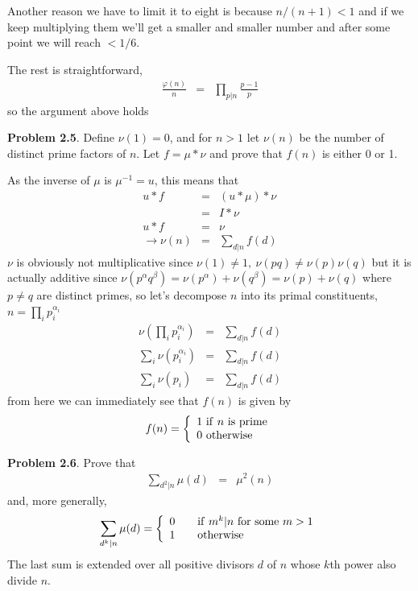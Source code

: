 \documentclass[aps,preprint,preprintnumbers,nofootinbib,showpacs,prd]{revtex4-1}
\newcommand{\nbea}{\begin{eqnarray*}}
\newcommand{\neea}{\end{eqnarray*}}
\begin{document}
Another reason we have to limit it to eight is because $n/(n+1) < 1$ and if we keep multiplying them we'll get a smaller and smaller number and after some point we will reach $< 1/6$.

The rest is straightforward,
%
\nbea
\frac{\varphi(n)}{n} & = & \prod_{p|n}\frac{p - 1}{p}
\neea
%
so the argument above holds

{\bf Problem 2.5}. Define $\nu(1) = 0$, and for $n > 1$ let $\nu(n)$ be the number of distinct prime factors of $n$. Let $f = \mu * \nu$ and prove that $f(n)$ is either 0 or 1.

As the inverse of $\mu$ is $\mu^{-1} = u$, this means that
%
\nbea
u * f & = & (u * \mu) * \nu \\
& = & I * \nu \\
u * f & = & \nu \\
\to \nu(n) & = & \sum_{d|n} f(d)
\neea
%
$\nu$ is obviously not multiplicative since $\nu(1) \neq 1,~\nu(pq) \neq \nu(p)\nu(q)$ but it is actually additive since $\nu(p^\alpha q^\beta) = \nu(p^\alpha) + \nu(q^\beta) = \nu(p) + \nu(q)$ where $p \neq q$ are distinct primes, so let's decompose $n$ into its primal constituents, $n = \prod_i p_i^{\alpha_i}$
%
\nbea
\nu\left(\prod_i p_i^{\alpha_i}\right) & = & \sum_{d|n} f(d) \\
\sum_i \nu\left(p_i^{\alpha_i}\right) & = & \sum_{d|n} f(d) \\
\sum_i \nu\left(p_i\right) & = & \sum_{d|n} f(d)
\neea
%
from here we can immediately see that $f(n)$ is given by
%
\nbea
f(n) = \left\{
\begin{array}{l}
1 {\rm~if~} n {\rm ~is~prime} \\
0 {\rm~otherwise}
\end{array} \right.
\neea
%

{\bf Problem 2.6}. Prove that
%
\nbea
\sum_{d^2|n} \mu(d) & = & \mu^2(n)
\neea
%
and, more generally,
%
\nbea
\sum_{d^k|n} \mu(d) = \left \{
\begin{array}{l c l}
0 & & {\rm if~} m^k|n {\rm~for~some~} m > 1 \\
1 & & {\rm otherwise}
\end{array}\right.
\neea
%
The last sum is extended over all positive divisors $d$ of $n$ whose $k$th power also divide $n$.
\end{document}
